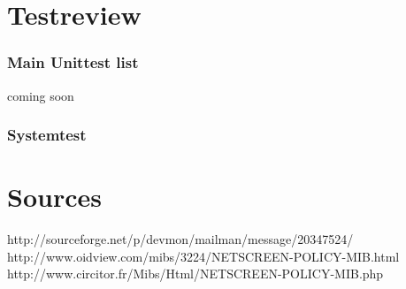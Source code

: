 \documentclass[a4paper,12pt]{scrreprt}
\begin{document}
\chapter{Testreview}
\subsection{Main Unittest list}
coming soon\\

\subsection{Systemtest}


\chapter{Sources}
http://sourceforge.net/p/devmon/mailman/message/20347524/\\
http://www.oidview.com/mibs/3224/NETSCREEN-POLICY-MIB.html\\
http://www.circitor.fr/Mibs/Html/NETSCREEN-POLICY-MIB.php\\
\end{document}
